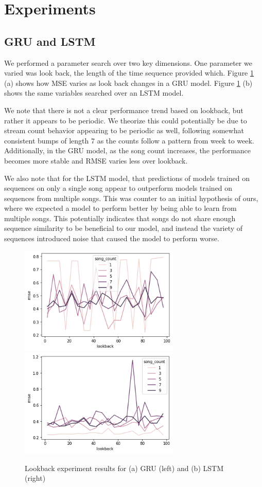\documentclass[11pt]{article}
\begin{document}
\section{Experiments}

\subsection{GRU and LSTM}

We performed a parameter search over two key dimensions. One parameter we varied was look back, the length of the time sequence provided which. Figure \ref{lookbackfig} (a) shows how MSE varies as look back changes in a GRU model. Figure \ref{lookbackfig} (b) shows the same variables searched over an LSTM model.

We note that there is not a clear performance trend based on lookback, but rather it appears to be periodic. We theorize this could potentially be due to stream count behavior appearing to be periodic as well, following somewhat consistent bumps of length 7 as the counts follow a pattern from week to week. Additionally, in the GRU model, as the song count increases, the performance becomes more stable and RMSE varies less over lookback. 

We also note that for the LSTM model, that predictions of models trained on sequences on only a single song appear to outperform models trained on sequences from multiple songs. This was counter to an initial hypothesis of ours, where we expected a model to perform better by being able to learn from multiple songs. This potentially indicates that songs do not share enough sequence similarity to be beneficial to our model, and instead the variety of sequences introduced noise that caused the model to perform worse. 


\begin{figure}[H]
    \centering
    \includegraphics[width=3in]{figs/gru_lookback}
    \includegraphics[width=3in]{figs/lstm_lookback}
    \caption{Lookback experiment results for (a) GRU (left) and (b) LSTM (right)}
    \label{lookbackfig}
\end{figure}
\end{document}
